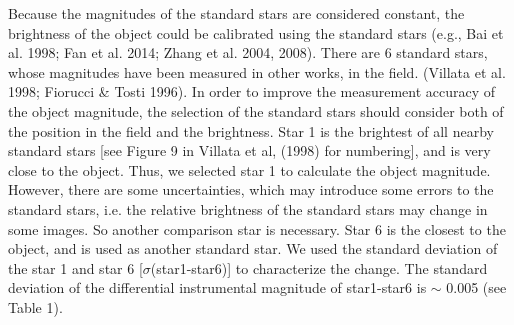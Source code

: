 \documentclass[structabstract]{raa}
\begin{document}
   Because the magnitudes of the standard stars are considered constant, the brightness of the object could be calibrated using the
   standard stars  (e.g., Bai et al. 1998; Fan et al. 2014; Zhang et al. 2004, 2008). There are 6 standard stars, whose magnitudes have
   been measured in other works, in the field. (Villata et al. 1998; Fiorucci \& Tosti 1996). In order to improve the measurement accuracy
   of the object magnitude, the selection of the standard stars should consider both of the position in the field and the brightness.
   Star 1 is the brightest of all nearby standard stars [see Figure 9 in Villata et al, (1998) for numbering], and is very close to the object.
   Thus, we selected star 1 to calculate the object magnitude. However, there are some uncertainties, which may introduce some errors
   to the standard stars, i.e. the relative brightness of the standard stars may change in some images. So another comparison star is
   necessary. Star 6 is the closest to the object, and is used as another standard star. We used the standard deviation of the star 1 and star 6 [$\sigma$(star1-star6)] to characterize the change. The standard deviation of the differential instrumental magnitude of star1-star6 is
   $\sim$ 0.005 (see Table 1).
\end{document}
